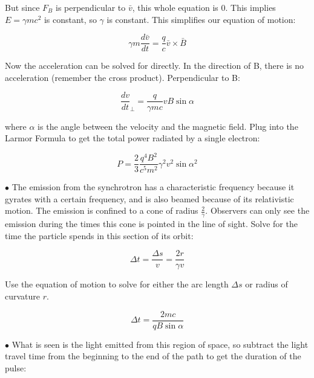 \begin{enumerate}
      But since $F_{B}$ is perpendicular to $\bar{v}$, this whole equation is $0$. This implies $E = \gamma mc^{2}$ is constant, so $\gamma$ is constant. This simplifies our equation of motion:
      
      \begin{equation}
      \gamma m \frac{d\bar{v}}{dt} = \frac{q}{c} \bar{v} \times \bar{B}
      \end{equation}
      
      Now the acceleration can be solved for directly. In the direction of B, there is no acceleration (remember the cross product). Perpendicular to B:
      
      \begin{equation}
      \frac{dv}{dt}_{\perp} = \frac{q}{\gamma mc} vB \sin{\alpha}
      \end{equation}
      
      where $\alpha$ is the angle between the velocity and the magnetic field. Plug into the Larmor Formula to get the total power radiated by a single electron:
      
      \begin{equation}
      P = \frac{2}{3} \frac{q^{4}B^{2}}{c^{5}m^{2}} \gamma^{2} v^{2} \sin{\alpha}^{2}
      \end{equation} 
      
      $\bullet$ The emission from the synchrotron has a characteristic frequency because it gyrates with a certain frequency, and is also beamed because of its relativistic motion. The emission is confined to a cone of radius $\frac{2}{\gamma}$. Observers can only see the emission during the times this cone is pointed in the line of sight. Solve for the time the particle spends in this section of its orbit:
      
      \begin{equation}
      \Delta t = \frac{\Delta s}{v} = \frac{2r}{\gamma v}
      \end{equation}
      
      Use the equation of motion to solve for either the arc length $\Delta s$ or radius of curvature $r$.
      
      \begin{equation}
      \Delta t = \frac{2mc}{qB\sin{\alpha}}
      \end{equation}
      
      $\bullet$ What is seen is the light emitted from this region of space, so subtract the light travel time from the beginning to the end of the path to get the duration of the pulse:
      

\end{enumerate}
